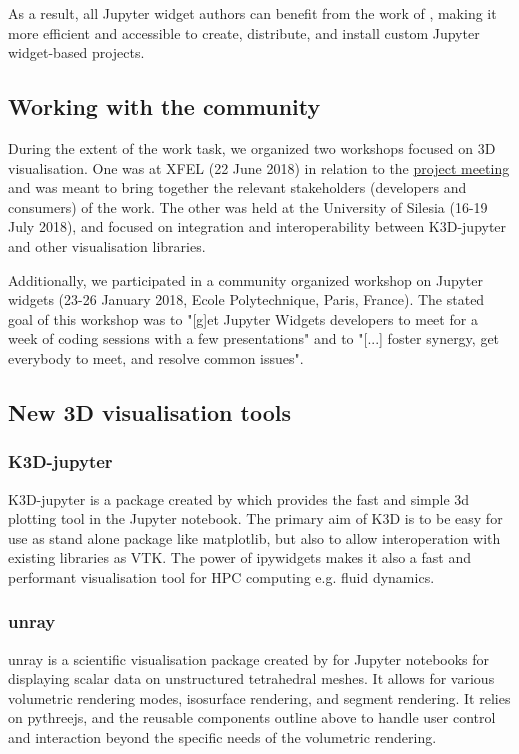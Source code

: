 \documentclass{deliverablereport}
\begin{document}
As a result, all Jupyter widget authors can benefit from the work of \ODK,
making it more efficient and accessible to create, distribute,
and install custom Jupyter widget-based projects.


\subsection{Working with the community}\label{community}

During the extent of the work task, we organized two workshops focused on 3D visualisation.
One was at XFEL (22 June 2018) in relation to the \href{https://opendreamkit.org/2018/06/20/Hamburg-DisseminationWorkshop-SteeringMeeting/}{project meeting} and was meant to bring together the relevant stakeholders (developers and consumers) of the work. The other was held at the University of Silesia (16-19 July 2018), and focused on integration and interoperability between K3D-jupyter and other visualisation libraries.

Additionally, we participated in a community organized workshop on Jupyter widgets (23-26 January 2018, Ecole Polytechnique, Paris, France). The stated goal of this workshop was to "[g]et Jupyter Widgets developers to meet for a week of coding sessions with a few presentations" and to "[...] foster synergy, get everybody to meet, and resolve common issues".


\subsection{New 3D visualisation tools}\label{new-3d}

\subsubsection{K3D-jupyter}

K3D-jupyter is a package created by \ODK which provides the fast and simple 3d
plotting tool in the Jupyter notebook. The primary aim of K3D is to be
easy for use as stand alone package like matplotlib, but also to
allow interoperation with existing libraries as VTK. The power of
ipywidgets makes it also a fast and performant visualisation tool for
HPC computing e.g. fluid dynamics.


\subsubsection{unray}


unray is a scientific visualisation package created by \ODK for Jupyter notebooks for displaying
scalar data on unstructured tetrahedral meshes. It allows for various volumetric
rendering modes, isosurface rendering, and segment rendering.
It relies on pythreejs, and the reusable components outline above to handle
user control and interaction beyond the specific needs of the volumetric
rendering.
\end{document}
